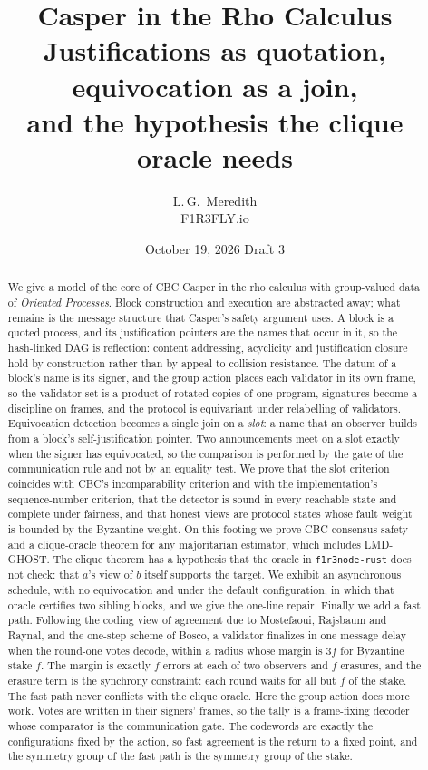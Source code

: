 \documentclass[11pt]{article}
\title{\textbf{Casper in the Rho Calculus}\\[0.4em]
\large Justifications as quotation, equivocation as a join,\\
and the hypothesis the clique oracle needs}
\author{L.\,G.\ Meredith\\ \small F1R3FLY.io}
\date{October 19, 2026 \quad\textendash\quad Draft 3}
\theoremstyle{definition}
\theoremstyle{remark}
\begin{document}
\maketitle

\begin{abstract}
\noindent
We give a model of the core of CBC Casper in the rho calculus with group-valued
data of \emph{Oriented Processes}. Block construction and execution are
abstracted away; what remains is the message structure that Casper's safety
argument uses. A block is a quoted process, and its justification pointers are
the names that occur in it, so the hash-linked DAG is reflection: content
addressing, acyclicity and justification closure hold by construction rather
than by appeal to collision resistance. The datum of a block's name is its
signer, and the group action places each validator in its own frame, so the
validator set is a product of rotated copies of one program, signatures become a
discipline on frames, and the protocol is equivariant under relabelling of
validators. Equivocation detection becomes a single join on a \emph{slot}: a
name that an observer builds from a block's self-justification pointer. Two
announcements meet on a slot exactly when the signer has equivocated, so the
comparison is performed by the gate of the communication rule and not by an
equality test. We prove that the slot criterion coincides with CBC's
incomparability criterion and with the implementation's sequence-number
criterion, that the detector is sound in every reachable state and complete
under fairness, and that honest views are protocol states whose fault weight is
bounded by the Byzantine weight. On this footing we prove CBC consensus safety
and a clique-oracle theorem for any majoritarian estimator, which includes
LMD-GHOST. The clique theorem has a hypothesis that the oracle in
\texttt{f1r3node-rust} does not check: that $a$'s view of $b$ itself supports
the target. We exhibit an asynchronous schedule, with no equivocation and under
the default configuration, in which that oracle certifies two sibling blocks,
and we give the one-line repair. Finally we add a fast path. Following the
coding view of agreement due to Mostefaoui, Rajsbaum and Raynal, and the
one-step scheme of Bosco, a validator finalizes in one message delay when the
round-one votes decode, within a radius whose margin is $3f$ for Byzantine
stake $f$. The margin is exactly $f$ errors at each of two observers and $f$
erasures, and the erasure term is the synchrony constraint: each round waits
for all but $f$ of the stake. The fast path never conflicts with the clique
oracle. Here the group action does more work. Votes are written in their
signers' frames, so the tally is a frame-fixing decoder whose comparator is
the communication gate. The codewords are exactly the configurations fixed by
the action, so fast agreement is the return to a fixed point, and the
symmetry group of the fast path is the symmetry group of the stake.
\end{abstract}
\end{document}
